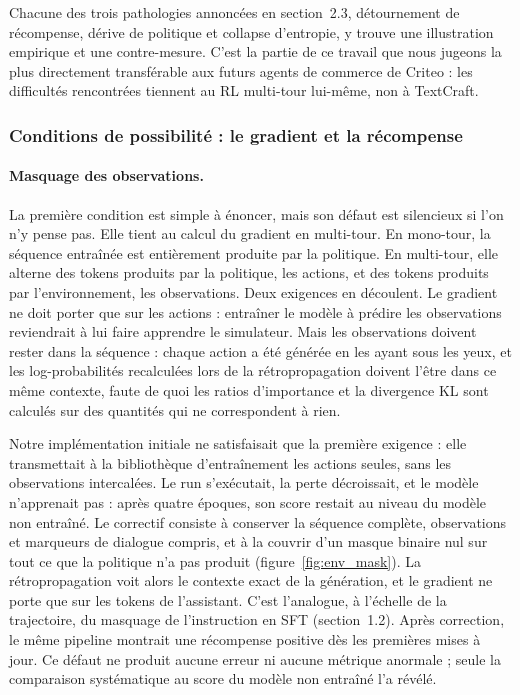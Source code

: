 \documentclass[11pt,a4paper]{article}
\begin{document}
Chacune des trois pathologies annoncées en section~2.3, détournement de récompense, dérive de politique et collapse d'entropie, y trouve une illustration empirique et une contre-mesure. C'est la partie de ce travail que nous jugeons la plus directement transférable aux futurs agents de commerce de Criteo : les difficultés rencontrées tiennent au RL multi-tour lui-même, non à TextCraft.

\subsubsection{Conditions de possibilité : le gradient et la récompense}

\paragraph{Masquage des observations.} La première condition est simple à énoncer, mais son défaut est silencieux si l'on n'y pense pas. Elle tient au calcul du gradient en multi-tour. En mono-tour, la séquence entraînée est entièrement produite par la politique. En multi-tour, elle alterne des tokens produits par la politique, les actions, et des tokens produits par l'environnement, les observations. Deux exigences en découlent. Le gradient ne doit porter que sur les actions : entraîner le modèle à prédire les observations reviendrait à lui faire apprendre le simulateur. Mais les observations doivent rester dans la séquence : chaque action a été générée en les ayant sous les yeux, et les log-probabilités recalculées lors de la rétropropagation doivent l'être dans ce même contexte, faute de quoi les ratios d'importance et la divergence KL sont calculés sur des quantités qui ne correspondent à rien.

Notre implémentation initiale ne satisfaisait que la première exigence : elle transmettait à la bibliothèque d'entraînement les actions seules, sans les observations intercalées. Le run s'exécutait, la perte décroissait, et le modèle n'apprenait pas : après quatre époques, son score restait au niveau du modèle non entraîné. Le correctif consiste à conserver la séquence complète, observations et marqueurs de dialogue compris, et à la couvrir d'un masque binaire nul sur tout ce que la politique n'a pas produit (figure~\ref{fig:env_mask}). La rétropropagation voit alors le contexte exact de la génération, et le gradient ne porte que sur les tokens de l'assistant. C'est l'analogue, à l'échelle de la trajectoire, du masquage de l'instruction en SFT (section~1.2). Après correction, le même pipeline montrait une récompense positive dès les premières mises à jour. Ce défaut ne produit aucune erreur ni aucune métrique anormale ; seule la comparaison systématique au score du modèle non entraîné l'a révélé.
\end{document}
